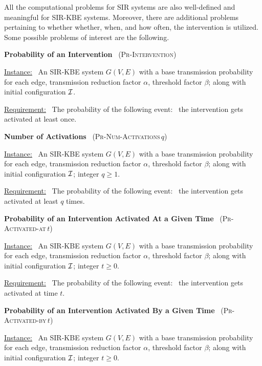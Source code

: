 \documentclass[11pt]{article}
\newcommand{\cali}{\mbox{${\cal I}$}}
\newcommand{\Int}{\textsc{Pr-Intervention}}
\newcommand{\tActivatedAt}{\mbox{\textsc{Pr-Activated-at}$\,t$}}
\newcommand{\tActivatedBy}{\mbox{\textsc{Pr-Activated-by}$\,t$}}
\newcommand{\NumActivations}{\mbox{\textsc{Pr-Num-Activations}$\,q$}}
\begin{document}
All the computational problems for SIR systems 
are also well-defined and meaningful for SIR-KBE systems.
Moreover, there are additional problems pertaining to whether whether, when, and how often,
the intervention is utilized. Some possible problems of interest are the following.

\bigskip

\noindent
\textbf{Probability of an Intervention}~ (\Int)

\medskip
\noindent
\underline{Instance:}~ An SIR-KBE system $G(V,E)$ with a base transmission probability for each edge,
transmission reduction factor $\alpha$, threshold factor $\beta$;
along with initial configuration \cali.

\smallskip
\noindent
\underline{Requirement:}~ The probability of the following
event:~ the intervention gets activated at least once.

\bigskip

\noindent
\textbf{Number of Activations}~ ({\NumActivations})

\medskip
\noindent
\underline{Instance:}~ An SIR-KBE system $G(V,E)$ with a base transmission probability for each edge,
transmission reduction factor $\alpha$, threshold factor $\beta$;
along with initial configuration \cali; integer $q \geq 1$.

\smallskip
\noindent
\underline{Requirement:}~ The probability of the following
event:~ the intervention gets activated at least $q$ times.

\bigskip

\noindent
\textbf{Probability of an Intervention Activated At a Given Time}~ (\tActivatedAt)

\medskip
\noindent
\underline{Instance:}~ An SIR-KBE system $G(V,E)$ with a base transmission probability for each edge,
transmission reduction factor $\alpha$, threshold factor $\beta$;
along with initial configuration \cali; integer $t \geq 0$.

\smallskip
\noindent
\underline{Requirement:}~ The probability of the following
event:~ the intervention gets activated at time $t$.

\bigskip

\noindent
\textbf{Probability of an Intervention Activated By a Given Time}~ (\tActivatedBy)

\medskip
\noindent
\underline{Instance:}~ An SIR-KBE system $G(V,E)$ with a base transmission probability for each edge,
transmission reduction factor $\alpha$, threshold factor $\beta$;
along with initial configuration \cali; integer $t \geq 0$.
\end{document}
